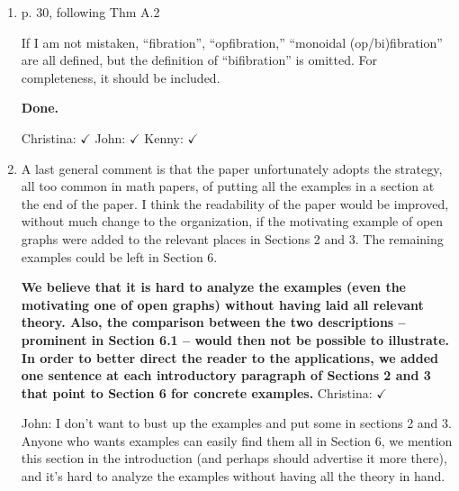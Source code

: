 \documentclass[reqno]{amsart}
\def\chris{\color{purple} Christina: }
\def\john{\color{red} John: }
\def\kenny{\color{blue} Kenny: }
\begin{document}
\begin{enumerate}
{\chris Sounds good! However I am a bit stuck on the following. Remember also in 
\href{https://thalis.math.upatras.gr/~cvasilak/documents/MonGroth.pdf}{MonoidalGrothendieck}, we had this issue of a lax monoidal pseudofunctor not 
really being a lax monoidal functor in the split case, whatever I mean here. This also arised for Brendan's graph if I am not wrong. Really what is 
going on is that for a (strictly) lax monoidal functor into Cat, the laxator is strictly natural and associativity is an equality, whereas a (weakly) 
lax monoidal functor into Cat may be strict as a functor, but the laxator is still pseudonatural and associativity still an isomorphism, as per our 
diagram (5). So I am not 100\% sure the starting statement in the second paragraph above is true. Let us think about that for a moment, it may end up 
being true in this case.}

\item p. 30, following Thm A.2

If I am not mistaken, “fibration”, “opfibration,” “monoidal (op/bi)fibration” are all defined, but the definition of “bifibration” is omitted. For 
completeness, it should be included.

{\bf Done.} 

{\chris $\checkmark$} {\john $\checkmark$}  {\kenny $\checkmark$}

\item A last general comment is that the paper unfortunately adopts the strategy, all too common in math papers, of putting all the examples in a 
section at 
the end of the paper. I think the readability of the paper would be improved, without much change to the organization, if the motivating example of 
open graphs were added to the relevant places in Sections 2 and 3. The remaining examples could be left in Section 6.

{\bf We believe that it is hard to analyze the examples (even the motivating one of open graphs) without having laid all relevant theory. Also, 
the comparison between the two descriptions -- prominent in Section 6.1 -- would then not be possible to illustrate. In order to 
better direct the reader to the applications, we added one sentence at each introductory paragraph of Sections 2 and 3 that point to Section 6 for 
concrete examples.} {\chris $\checkmark$}

{\john
I don't want to bust up the examples and put some in sections 2 and 3. Anyone who wants examples can easily find them all in Section 6, we mention 
this section in the introduction (and perhaps should advertise it more there), and it's hard to analyze the examples without having all the theory in 
hand.}


\end{enumerate}
\end{document}
